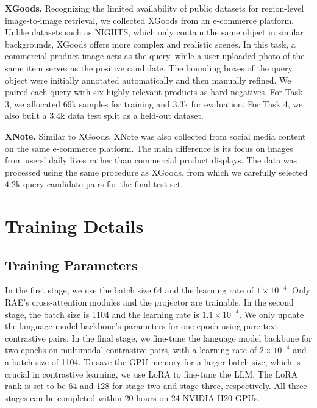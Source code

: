 \textbf{XGoods.} Recognizing the limited availability of public datasets for region-level image-to-image retrieval, we collected XGoods from an e-commerce platform. Unlike datasets such as NIGHTS, which only contain the same object in similar backgrounds, XGoods offers more complex and realistic scenes. In this task, a commercial product image acts as the query, while a user-uploaded photo of the same item serves as the positive candidate. The bounding boxes of the query object were initially annotated automatically and then manually refined. We paired each query with six highly relevant products as hard negatives. For Task 3, we allocated 69k samples for training and 3.3k for evaluation. For Task 4, we also built a 3.4k data test split as a held-out dataset.


\textbf{XNote.} Similar to XGoods, XNote was also collected from social media content on the same e-commerce platform. The main difference is its focus on images from users' daily lives rather than commercial product displays. The data was processed using the same procedure as XGoods, from which we carefully selected 4.2k query-candidate pairs for the final test set.



\section{Training Details}
\label{sec:app-train}

\subsection{Training Parameters}
In the first stage, we use the batch size 64 and the learning rate of $1 \times 10^{-4}$. Only RAE's cross-attention modules and the projector are trainable.
In the second stage, the batch size is 1104 and the learning rate is $1.1 \times 10^{-4}$. We only update the language model backbone's parameters for one epoch using pure-text contrastive pairs. 
In the final stage, we fine-tune the language model backbone for two epochs on multimodal contrastive pairs, with a learning rate of $2 \times 10^{-4}$ and a batch size of 1104. 
To save the GPU memory for a larger batch size, which is crucial in contrastive learning, we use LoRA to fine-tune the LLM. The LoRA rank is set to be 64 and 128 for stage two and stage three, respectively. All three stages can be completed within 20 hours on 24 NVIDIA H20 GPUs. 

